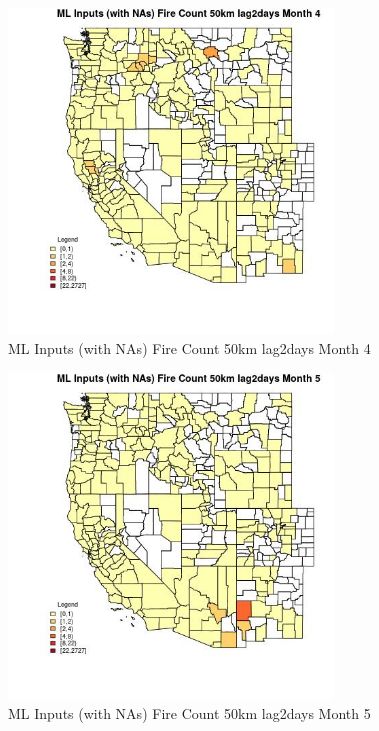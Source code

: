 \begin{figure} 
\centering  
\includegraphics[width=0.77\textwidth]{Code_Outputs/Report_ML_input_PM25_Step4_part_f_de_duplicated_aveswNAs_CountyFire_Count_50km_lag2daysmedianMonth4.jpg} 
\caption{\label{fig:Report_ML_input_PM25_Step4_part_f_de_duplicated_aveswNAsCountyFire_Count_50km_lag2daysmedianMonth4}ML Inputs (with NAs) Fire Count 50km lag2days Month 4} 
\end{figure} 
 

\begin{figure} 
\centering  
\includegraphics[width=0.77\textwidth]{Code_Outputs/Report_ML_input_PM25_Step4_part_f_de_duplicated_aveswNAs_CountyFire_Count_50km_lag2daysmedianMonth5.jpg} 
\caption{\label{fig:Report_ML_input_PM25_Step4_part_f_de_duplicated_aveswNAsCountyFire_Count_50km_lag2daysmedianMonth5}ML Inputs (with NAs) Fire Count 50km lag2days Month 5} 
\end{figure} 
 

